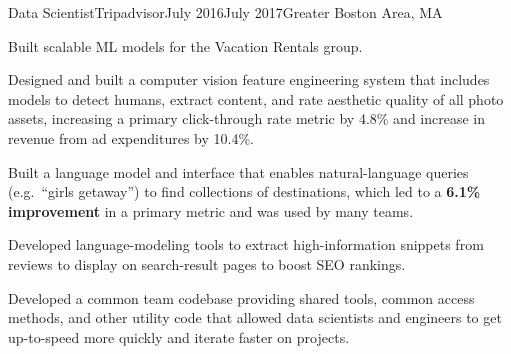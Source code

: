 \documentclass[print]{friggeri-cv} %
\begin{document}
\begin{job}
  {}{Data Scientist}{Tripadvisor}{July 2016}{July 2017}{Greater Boston Area, MA}{
    Built scalable ML models for the Vacation Rentals group.
    \begin{myitemize}
      \item Designed and built a computer vision feature engineering system that
      includes models to detect humans, extract content, and rate aesthetic
      quality of all photo assets, increasing a primary click-through rate
      metric by 4.8\% and increase in revenue from ad expenditures by 10.4\%.

      \item Built a language model and interface that enables natural-language queries (e.g.\ ``girls getaway'') to find
      collections of destinations, which led to a \textbf{6.1\% improvement} in a primary metric and was
      used by many teams.

      \item Developed language-modeling tools to extract high-information snippets from reviews to display on
      search-result pages to boost SEO rankings.

      \item Developed a common team codebase providing shared tools, common access methods, and other utility
      code that allowed data scientists and engineers to get up-to-speed more quickly and iterate
      faster on projects.
    \end{myitemize}
  }
\end{job}
\end{document}
